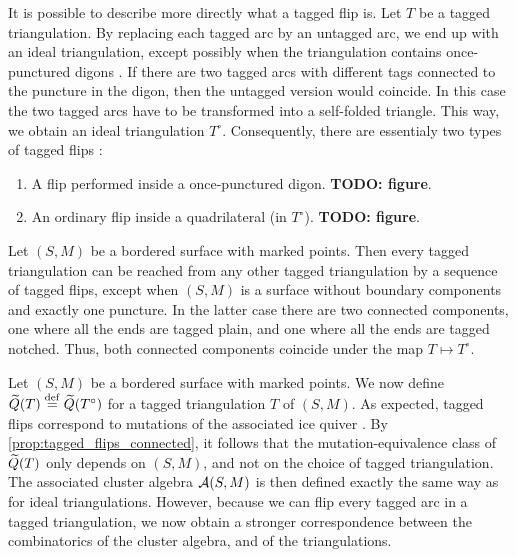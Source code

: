 It is possible to describe more directly what a tagged flip is. Let $T$ be a tagged
triangulation. By replacing each tagged arc by an untagged arc, we end up with an ideal
triangulation, except possibly when the triangulation contains once-punctured digons \parencite[Remark 7.6]{FominShapiroThurston2008CATriangulatedSurfacesI}. If there are two
tagged arcs with different tags connected to the puncture in the digon, then the
untagged version would coincide. In this case the two tagged arcs have to be
transformed into a self-folded triangle. This way, we obtain an ideal triangulation
$T^\circ$. Consequently, there are essentialy two types of tagged flips \cite[Remark
	5.13]{FominThurston2018CATriangulatedSurfacesII}:
\begin{enumerate}
	\item A flip performed inside a once-punctured digon. \textbf{TODO: figure}.
	\item An ordinary flip inside a quadrilateral (in $T^\circ$). \textbf{TODO: figure}.
\end{enumerate}

\begin{proposition}\label{prop:tagged_flips_connected}

	Let $(S, M)$ be a bordered surface with marked points. Then every tagged triangulation
	can be reached from any other tagged triangulation by a sequence of tagged flips,
	except when $(S, M)$ is a surface without boundary components and exactly one puncture.
	In the latter case there are two connected components, one where all the ends are
	tagged plain, and one where all the ends are tagged notched. Thus, both connected
	components coincide under the map $T \mapsto T^\circ$.
\end{proposition}

Let $(S, M)$ be a bordered surface with marked points. We now define $\widetilde{Q}(T) \overset{\mathrm{def}}{=}
	\widetilde{Q}(T^\circ)$ for a tagged triangulation $T$ of $(S, M)$. As expected, tagged flips
correspond to mutations of the associated ice quiver \parencite[Lemma 9.7]{FominShapiroThurston2008CATriangulatedSurfacesI}. By
\cref{prop:tagged_flips_connected}, it follows that the mutation-equivalence class of
$\widetilde{Q}(T)$ only depends on $(S, M)$, and not on the choice of tagged triangulation. The
associated cluster algebra $\mathcal{A}(S, M)$ is then defined exactly the same way as for
ideal triangulations. However, because we can flip every tagged arc in a tagged
triangulation, we now obtain a stronger correspondence between the combinatorics of the
cluster algebra, and of the triangulations.

